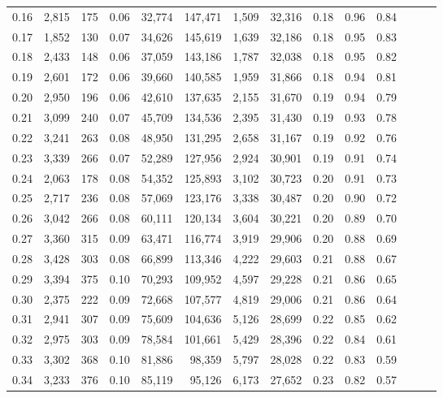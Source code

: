 \begin{tabular}{rrrrrrrrrrrrrr}
0.16 &  2,815 &  175 &  0.06 &   32,774 &  147,471 &   1,509 &  32,316 &  0.18 &  0.96 &      0.84 \\
0.17 &  1,852 &  130 &  0.07 &   34,626 &  145,619 &   1,639 &  32,186 &  0.18 &  0.95 &      0.83 \\
0.18 &  2,433 &  148 &  0.06 &   37,059 &  143,186 &   1,787 &  32,038 &  0.18 &  0.95 &      0.82 \\
0.19 &  2,601 &  172 &  0.06 &   39,660 &  140,585 &   1,959 &  31,866 &  0.18 &  0.94 &      0.81 \\
0.20 &  2,950 &  196 &  0.06 &   42,610 &  137,635 &   2,155 &  31,670 &  0.19 &  0.94 &      0.79 \\
0.21 &  3,099 &  240 &  0.07 &   45,709 &  134,536 &   2,395 &  31,430 &  0.19 &  0.93 &      0.78 \\
0.22 &  3,241 &  263 &  0.08 &   48,950 &  131,295 &   2,658 &  31,167 &  0.19 &  0.92 &      0.76 \\
0.23 &  3,339 &  266 &  0.07 &   52,289 &  127,956 &   2,924 &  30,901 &  0.19 &  0.91 &      0.74 \\
0.24 &  2,063 &  178 &  0.08 &   54,352 &  125,893 &   3,102 &  30,723 &  0.20 &  0.91 &      0.73 \\
0.25 &  2,717 &  236 &  0.08 &   57,069 &  123,176 &   3,338 &  30,487 &  0.20 &  0.90 &      0.72 \\
0.26 &  3,042 &  266 &  0.08 &   60,111 &  120,134 &   3,604 &  30,221 &  0.20 &  0.89 &      0.70 \\
0.27 &  3,360 &  315 &  0.09 &   63,471 &  116,774 &   3,919 &  29,906 &  0.20 &  0.88 &      0.69 \\
0.28 &  3,428 &  303 &  0.08 &   66,899 &  113,346 &   4,222 &  29,603 &  0.21 &  0.88 &      0.67 \\
0.29 &  3,394 &  375 &  0.10 &   70,293 &  109,952 &   4,597 &  29,228 &  0.21 &  0.86 &      0.65 \\
0.30 &  2,375 &  222 &  0.09 &   72,668 &  107,577 &   4,819 &  29,006 &  0.21 &  0.86 &      0.64 \\
0.31 &  2,941 &  307 &  0.09 &   75,609 &  104,636 &   5,126 &  28,699 &  0.22 &  0.85 &      0.62 \\
0.32 &  2,975 &  303 &  0.09 &   78,584 &  101,661 &   5,429 &  28,396 &  0.22 &  0.84 &      0.61 \\
0.33 &  3,302 &  368 &  0.10 &   81,886 &   98,359 &   5,797 &  28,028 &  0.22 &  0.83 &      0.59 \\
0.34 &  3,233 &  376 &  0.10 &   85,119 &   95,126 &   6,173 &  27,652 &  0.23 &  0.82 &      0.57 \\

\end{tabular}
